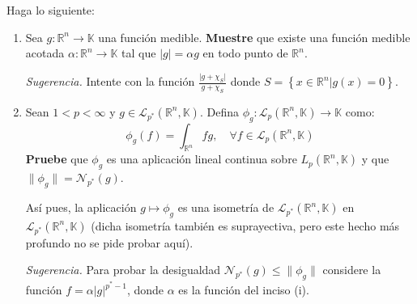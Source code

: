 \documentclass[12pt]{report}
\theoremstyle{largebreak}
\newcommand\abs[1]{\ensuremath{\big|#1\big|}}
\newcommand\cf[3]{\ensuremath{#1:#2\rightarrow#3}}
\newcommand{\N}[2]{\ensuremath{\mathcal{N}_{#1}\left(#2\right)}}
\begin{document}
    \begin{excer}
        Haga lo siguiente:
        \begin{enumerate}
            \item Sea $\cf{g}{\mathbb{R}^n}{\mathbb{K}}$ una función medible. \textbf{Muestre} que existe una función medible acotada $\cf{\alpha}{\mathbb{R}^n}{\mathbb{K}}$ tal que $\abs{g}=\alpha g$ en todo punto de $\mathbb{R}^n$.
            
            \textit{Sugerencia.} Intente con la función $\frac{\abs{g+\chi_S}}{g+\chi_S}$ donde $S=\left\{x\in\mathbb{R}^n\Big|g(x)=0 \right\}$.

            \item Sean $1<p<\infty$ y $g\in\mathcal{L}_{p^*}(\mathbb{R}^n,\mathbb{K})$. Defina $\cf{\phi_g}{\mathcal{L}_p(\mathbb{R}^n,\mathbb{K})}{\mathbb{K}}$ como:
            \begin{equation*}
                \phi_g(f)=\int_{\mathbb{R}^n}fg,\quad\forall f\in\mathcal{L}_p(\mathbb{R}^n,\mathbb{K})
            \end{equation*}
            \textbf{Pruebe} que $\phi_g$ es una aplicación lineal continua sobre $L_p(\mathbb{R}^n,\mathbb{K})$ y que $\|\phi_g\|=\N{p^*}{g}$.

            Así pues, la aplicación $g\mapsto\phi_g$ es una isometría de $\mathcal{L}_{p^*}(\mathbb{R}^n,\mathbb{K})$ en $\mathcal{L}_{p^*}(\mathbb{R}^n,\mathbb{K})$ (dicha isometría también es suprayectiva, pero este hecho más profundo no se pide probar aquí).

            \textit{Sugerencia.} Para probar la desigualdad $\N{p^*}{g}\leq\|\phi_g\|$ considere la función $f=\alpha\abs{g}^{p^*-1}$, donde $\alpha$ es la función del inciso (i).


\end{enumerate}
\end{excer}
\end{document}
